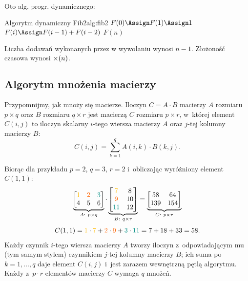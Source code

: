Oto alg. progr. dynamicznego:
\begin{alg}{Algorytm dynamiczny Fib2}{alg:fib2}
	 
	 
	\EndIf
	\State $F(0) \Assign F(1) \Assign 1$
	\State $F(i) \Assign F(i - 1) + F(i - 2)$
	\EndFor
	\State \Return $F(n)$
	\EndFunction
\end{alg}

Liczba dodawań wykonanych przez  w wywołaniu  wynosi $n - 1$.
Złożoność czasowa wynosi $\mathcal{\Theta}(n)$.

\subsection{Algorytm mnożenia macierzy}

Przypomnijmy, jak mnoży się macierze. Iloczyn $C = A \cdot B$ macierzy $A$ rozmiaru $p \times q$
oraz $B$ rozmiaru $q \times r$ jest macierzą $C$ rozmiaru $p \times r$, w~której element $C(i, j)$
to iloczyn skalarny $i$-tego wiersza macierzy $A$ oraz $j$-tej kolumny macierzy $B$:
\[
	C(i, j) = \sum_{k = 1}^{q} A(i, k) \cdot B(k, j).
\]

\newcommand{\mmI}[1]{{\color{accentA}#1}}
\newcommand{\mmII}[1]{{\color{accentB}#1}}
\newcommand{\mmIII}[1]{{\color{accentC}#1}}

Biorąc dla przykładu $p = 2$, $q = 3$, $r = 2$ i~obliczając wyróżniony element $C(1, 1)$:
\[
	\underbrace{\begin{bmatrix}
			\mmI{1} & \mmII{2} & \mmIII{3} \\
			4       & 5        & 6
		\end{bmatrix}}_{A:\ p \times q}
	\cdot
	\underbrace{\begin{bmatrix}
			\mmI{7}    & 8  \\
			\mmII{9}   & 10 \\
			\mmIII{11} & 12
		\end{bmatrix}}_{B:\ q \times r}
	=
	\underbrace{\begin{bmatrix}
			58  & 64  \\
			139 & 154
		\end{bmatrix}}_{C:\ p \times r}
\]
\[
	C(1, 1) = \mmI{1} \cdot \mmI{7} + \mmII{2} \cdot \mmII{9}
	+ \mmIII{3} \cdot \mmIII{11} = 7 + 18 + 33 = 58.
\]
Każdy czynnik $i$-tego wiersza macierzy $A$ tworzy iloczyn z~odpowiadającym mu (tym samym stylem)
czynnikiem $j$-tej kolumny macierzy $B$; ich suma po~$k = 1, \dots, q$ daje element $C(i, j)$ i~jest
zarazem wewnętrzną pętlą algorytmu. Każdy z~$p \cdot r$ elementów macierzy $C$ wymaga $q$ mnożeń.

